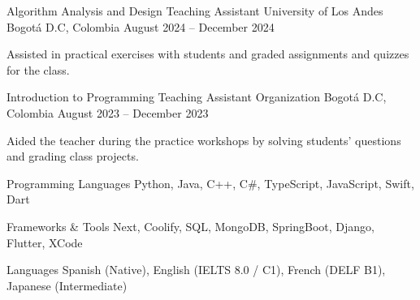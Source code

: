 \documentclass[11pt, a4paper]{awesome-cv}
\begin{document}
\begin{cventries}
  \cventry
    {Algorithm Analysis and Design Teaching Assistant}
    {University of Los Andes}
    {Bogot\'a D.C, Colombia}
    {August 2024 -- December 2024}
    {
      \begin{cvitems}
        \item {Assisted in practical exercises with students and graded assignments and quizzes for the class.}
      \end{cvitems}
    }

  \cventry
    {Introduction to Programming Teaching Assistant}
    {Organization}
    {Bogot\'a D.C, Colombia}
    {August 2023 -- December 2023}
    {
      \begin{cvitems}
        \item {Aided the teacher during the practice workshops by solving students' questions and grading class projects.}
      \end{cvitems}
    }

\end{cventries}


\begin{cvskills}

  \cvskill
    {Programming Languages}
    {Python, Java, C++, C\#, TypeScript, JavaScript, Swift, Dart}

  \cvskill
    {Frameworks \& Tools}
    {Next, Coolify, SQL, MongoDB, SpringBoot, Django, Flutter, XCode}

  \cvskill
    {Languages}
    {Spanish (Native), English (IELTS 8.0 / C1), French (DELF B1), Japanese (Intermediate)}

\end{cvskills}
\end{document}
